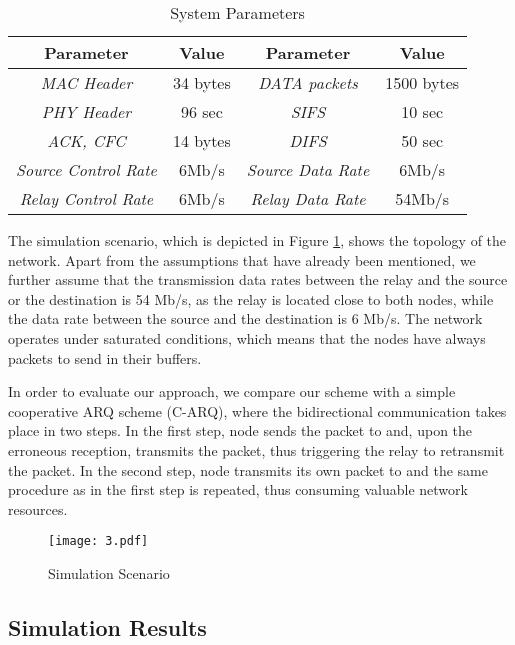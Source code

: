 \documentclass[conference]{IEEEtran}
\begin{document}
\begin{table}[h]
\caption{System Parameters} \label{t1}
\begin{center}
\begin{tabular}{|c|c|c|c|}
\hline
\textbf{Parameter} & \textbf{Value} & \textbf{Parameter} & \textbf{Value} \\ \hline
\textit{MAC Header} & 34 bytes & \textit{DATA packets} & 1500 bytes \\ \hline
\textit{PHY Header} & 96 sec & \textit{SIFS} & 10 sec \\ \hline
\textit{ACK, CFC} & 14 bytes & \textit{DIFS} & 50 sec \\ \hline
\textit{Source Control Rate} & 6Mb/s & \textit{Source Data Rate} & 6Mb/s \\ \hline
\textit{Relay Control Rate} & 6Mb/s & \textit{Relay Data Rate} & 54Mb/s \\ \hline
\end{tabular}
\end{center}
\end{table}

The simulation scenario, which is depicted in Figure \ref{f3}, shows the topology of the network. Apart from the assumptions that have already been mentioned, we further assume that the transmission data rates between the relay and the source or the destination is 54 Mb/s, as the relay is located close to both nodes, while the data rate between the source and the destination is 6 Mb/s. The network operates under saturated conditions, which means that the nodes have always packets to send in their buffers.

In order to evaluate our approach, we compare our scheme with a simple cooperative ARQ scheme (C-ARQ), where the bidirectional communication takes place in two steps. In the first step, node  sends the packet to  and, upon the erroneous reception,  transmits the  packet, thus triggering the relay to retransmit the packet. In the second step, node  transmits its own packet to  and the same procedure as in the first step is repeated, thus consuming valuable network resources.

\begin{figure}[htb]
\centering
\texttt{[image: 3.pdf]}
\caption{Simulation Scenario}\label{f3}
\end{figure}

\subsection{Simulation Results}
\end{document}
